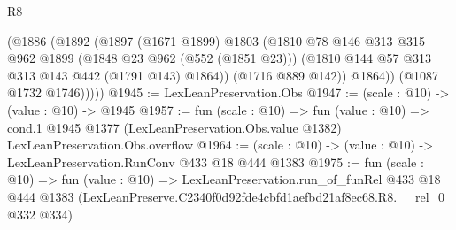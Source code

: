 \begin{lexlean}{R8}
\begin{coremodule}
            (@1886
              (@1892
                (@1897
                  (@1671 @1899)
                  @1803
                  (@1810
                    @78
                    @146
                    @313
                    @315
                    @962
                    @1899
                    (@1848 @23 @962 (@552 (@1851 @23)))
                    (@1810 @144 @57 @313 @313 @143 @442 (@1791 @143) @1864))
                  (@1716 @889 @142))
                @1864))
            (@1087 @1732 @1746)))))
@1945 := LexLeanPreservation.Obs
@1947 := (scale : @10) -> (value : @10) -> @1945
@1957 := fun (scale : @10) =>
  fun (value : @10) =>
  cond.{1} @1945 @1377 (LexLeanPreservation.Obs.value @1382) LexLeanPreservation.Obs.overflow
@1964 := (scale : @10) -> (value : @10) -> LexLeanPreservation.RunConv @433 @18 @444 @1383
@1975 := fun (scale : @10) =>
  fun (value : @10) =>
  LexLeanPreservation.run_of_funRel
    @433
    @18
    @444
    @1383
    (LexLeanPreserve.C2340f0d92fde4cbfd1aefbd21af8ec68.R8.__rel_0 @332 @334)
\end{coremodule}
\end{lexlean}
